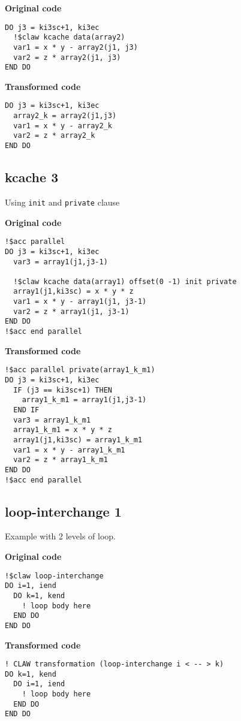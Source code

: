 \documentclass{article}
\begin{document}
\textbf{Original code}
\begin{lstlisting}
DO j3 = ki3sc+1, ki3ec
  !$claw kcache data(array2)
  var1 = x * y - array2(j1, j3)
  var2 = z * array2(j1, j3)
END DO
\end{lstlisting}


\textbf{Transformed code}
\begin{lstlisting}
DO j3 = ki3sc+1, ki3ec
  array2_k = array2(j1,j3)
  var1 = x * y - array2_k
  var2 = z * array2_k
END DO
\end{lstlisting}

\subsection{kcache 3}
\label{kcache3}
Using \lstinline!init! and \lstinline!private! clause

\textbf{Original code}
\begin{lstlisting}
!$acc parallel
DO j3 = ki3sc+1, ki3ec
  var3 = array1(j1,j3-1)

  !$claw kcache data(array1) offset(0 -1) init private
  array1(j1,ki3sc) = x * y * z
  var1 = x * y - array1(j1, j3-1)
  var2 = z * array1(j1, j3-1)
END DO
!$acc end parallel
\end{lstlisting}


\textbf{Transformed code}
\begin{lstlisting}
!$acc parallel private(array1_k_m1)
DO j3 = ki3sc+1, ki3ec
  IF (j3 == ki3sc+1) THEN
    array1_k_m1 = array1(j1,j3-1)
  END IF
  var3 = array1_k_m1
  array1_k_m1 = x * y * z
  array1(j1,ki3sc) = array1_k_m1
  var1 = x * y - array1_k_m1
  var2 = z * array1_k_m1
END DO
!$acc end parallel
\end{lstlisting}


\subsection{loop-interchange 1}
\label{loop-interchange1}
Example with 2 levels of loop. 

\textbf{Original code}
\begin{lstlisting}
!$claw loop-interchange
DO i=1, iend
  DO k=1, kend
    ! loop body here
  END DO
END DO
\end{lstlisting}

\textbf{Transformed code}
\begin{lstlisting}
! CLAW transformation (loop-interchange i < -- > k)
DO k=1, kend
  DO i=1, iend
    ! loop body here
  END DO
END DO
\end{lstlisting}
\end{document}
